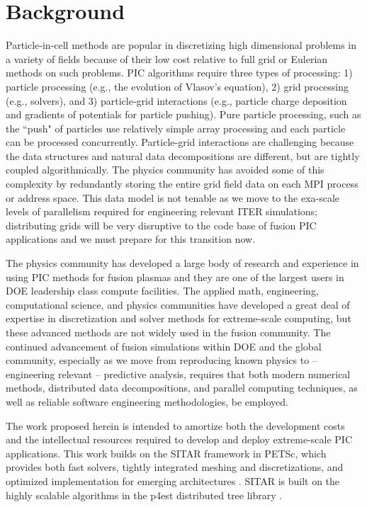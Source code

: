 \documentclass[review]{siamart}
\begin{document}
\section{Background}

Particle-in-cell methods are popular in discretizing high dimensional problems in a variety of fields because of their low cost relative to full grid or Eulerian methods on such problems.
PIC algorithms require three types of processing: 1) particle processing (e.g., the evolution of Vlasov's equation), 2) grid processing (e.g., solvers), and 3) particle-grid interactions (e.g., particle charge deposition and gradients of potentials for particle pushing).
Pure particle processing, such as the ``push" of particles use relatively simple array processing and each particle can be processed concurrently.
Particle-grid interactions are challenging because the data structures and natural data decompositions are different, but are tightly coupled algorithmically.
The physics community has avoided some of this complexity by redundantly storing the entire grid field data on each MPI process or address space.
This data model is not tenable as we move to the exa-scale levels of parallelism required for engineering relevant ITER simulations; distributing grids will be very disruptive to the code base of fusion PIC applications and we must prepare for this transition now.

The physics community has developed a large body of research and experience in using PIC methods for fusion plasmas and they are one of the largest users in DOE leadership class compute facilities.
The applied math, engineering, computational science, and physics communities have developed a great deal of expertise in discretization and solver methods for extreme-scale computing, but these advanced methods are not widely used in the fusion community.
The continued advancement of fusion simulations within DOE and the global community, especially as we move from reproducing known physics to -- engineering relevant -- predictive analysis, requires that both modern numerical methods, distributed data decompositions, and parallel computing techniques, as well as reliable software engineering methodologies, be employed.

The work proposed herein is intended to amortize both the development costs and the intellectual resources required to develop and deploy extreme-scale PIC applications.
This work builds on the SITAR framework in PETSc, which provides both fast solvers, tightly integrated meshing and discretizations, and optimized implementation for emerging architectures \cite{KnepleyBrownMcInnesSmithRuppAdams2015}.
SITAR is built on the highly scalable algorithms in the p4est distributed tree library \cite{DBLP:journals/siamsc/IsaacBWG15,Rudi:2015:EIS:2807591.2807675,Stadler1033}.
\end{document}
